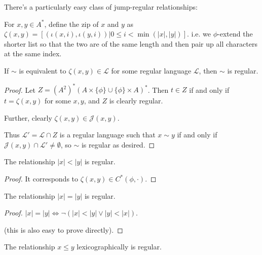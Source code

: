 There's a particularly easy class of jump-regular relationships:

\begin{definition}
For \(x, y \in A^*\), define the zip of \(x\) and \(y\) as \(\zeta(x, y) = [(\iota(x, i), \iota(y, i)) | 0 \leq i < \min(|x|, |y|)]\).
i.e. we \(\phi\)-extend the shorter list so that the two are of the same length and then pair up all characters at the same index.
\end{definition}

\begin{lemma}
If \(\sim\)
is equivalent to
\(\zeta(x, y) \in \mathcal{L}\)
for some regular language \(\mathcal{L}\),
then \(\sim\) is regular. 
\end{lemma}

\begin{proof}
Let \(Z = (A^2)^* (A \times \{\phi\} \cup \{\phi\} \times A)^*\).
Then \(t \in Z\) if and only if \(t = \zeta(x, y)\) for some \(x, y\),
and \(Z\) is clearly regular.

Further, clearly \(\zeta(x, y) \in \mathcal{J}(x, y)\).

Thus \(\mathcal{L}' = \mathcal{L} \cap Z\) is a regular language such that \(x \sim y\) if and only if \(\mathcal{J}(x, y) \cap \mathcal{L}' \neq \emptyset\),
so \(\mathcal{\sim}\) is regular as desired.

\end{proof}

\begin{proposition}
The relationship \(|x| < |y|\) is regular.
\end{proposition}

\begin{proof}
It corresponds to \(\zeta(x, y) \in C^* (\phi, \cdot)\).
\end{proof}

\begin{corollary}
The relationship \(|x| = |y|\) is regular.
\end{corollary}

\begin{proof}
\(|x| = |y| \iff \neg (|x| < |y| \vee |y| < |x|)\).

(this is also easy to prove directly).
\end{proof}

\begin{proposition}
The relationship \(x \leq y\) lexicographically is regular.
\end{proposition}

